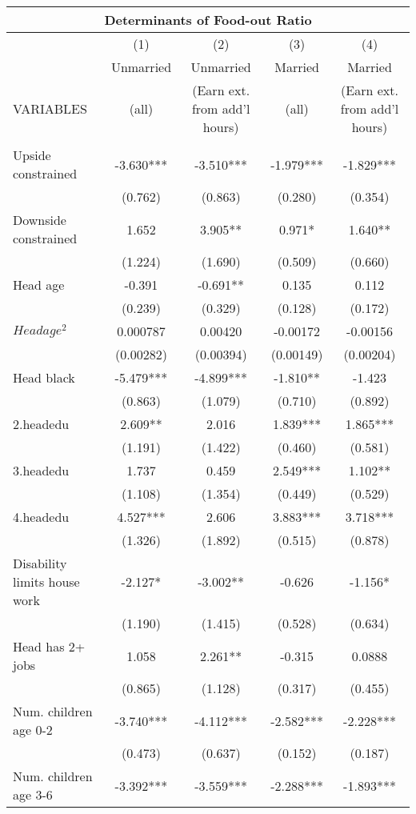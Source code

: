 \begin{tabular}{lcccc}
\multicolumn{5}{c}{Determinants of Food-out Ratio} \\ \hline
 & (1) & (2) & (3) & (4) \\
 & Unmarried & Unmarried & Married & Married \\
VARIABLES & (all) & (Earn ext. from add'l hours) & (all) & (Earn ext. from add'l hours) \\ \hline
 &  &  &  &  \\
Upside constrained & -3.630*** & -3.510*** & -1.979*** & -1.829*** \\
 & (0.762) & (0.863) & (0.280) & (0.354) \\
Downside constrained & 1.652 & 3.905** & 0.971* & 1.640** \\
 & (1.224) & (1.690) & (0.509) & (0.660) \\
Head age & -0.391 & -0.691** & 0.135 & 0.112 \\
 & (0.239) & (0.329) & (0.128) & (0.172) \\
$ Head age^2$ & 0.000787 & 0.00420 & -0.00172 & -0.00156 \\
 & (0.00282) & (0.00394) & (0.00149) & (0.00204) \\
Head black & -5.479*** & -4.899*** & -1.810** & -1.423 \\
 & (0.863) & (1.079) & (0.710) & (0.892) \\
2.headedu & 2.609** & 2.016 & 1.839*** & 1.865*** \\
 & (1.191) & (1.422) & (0.460) & (0.581) \\
3.headedu & 1.737 & 0.459 & 2.549*** & 1.102** \\
 & (1.108) & (1.354) & (0.449) & (0.529) \\
4.headedu & 4.527*** & 2.606 & 3.883*** & 3.718*** \\
 & (1.326) & (1.892) & (0.515) & (0.878) \\
Disability limits house work & -2.127* & -3.002** & -0.626 & -1.156* \\
 & (1.190) & (1.415) & (0.528) & (0.634) \\
Head has 2+ jobs & 1.058 & 2.261** & -0.315 & 0.0888 \\
 & (0.865) & (1.128) & (0.317) & (0.455) \\
Num. children age 0-2 & -3.740*** & -4.112*** & -2.582*** & -2.228*** \\
 & (0.473) & (0.637) & (0.152) & (0.187) \\
Num. children age 3-6 & -3.392*** & -3.559*** & -2.288*** & -1.893*** \\

\end{tabular}
